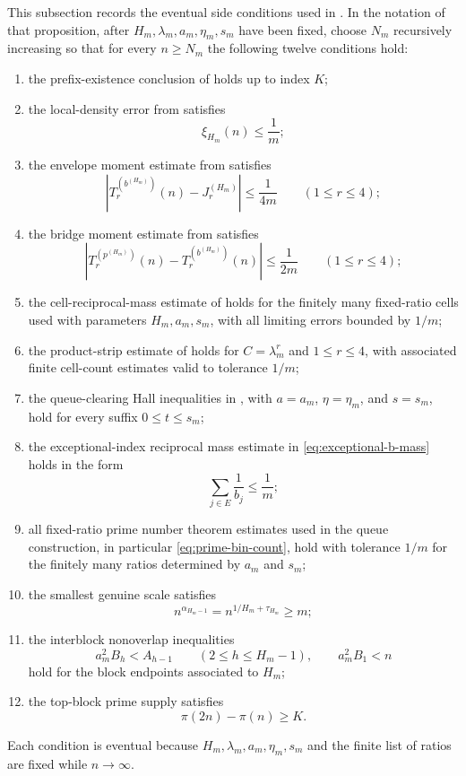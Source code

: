 This subsection records the eventual side conditions used in
.  In the notation of that proposition,
after $H_m,\lambda_m,a_m,\eta_m,s_m$ have been fixed, choose $N_m$ recursively
increasing so that for every $n\ge N_m$ the following twelve conditions hold:
\begin{enumerate}
  \item the prefix-existence conclusion of  holds
  up to index $K$;
  \item the local-density error from  satisfies
  \[
    \xi_{H_m}(n)\le \frac1m;
    \tag{7.10a}\label{eq:diag-xi}
  \]
  \item the envelope moment estimate from 
  satisfies
  \[
    |T_r^{(b^{(H_m)})}(n)-J_r^{(H_m)}|\le \frac{1}{4m}
    \qquad (1\le r\le4);
    \tag{7.10b}\label{eq:diag-envelope}
  \]
  \item the bridge moment estimate from 
  satisfies
  \[
    |T_r^{(p^{(H_m)})}(n)-T_r^{(b^{(H_m)})}(n)|\le \frac{1}{2m}
    \qquad (1\le r\le4);
    \tag{7.10c}\label{eq:diag-bridge}
  \]
  \item the cell-reciprocal-mass estimate of
   holds for the finitely many fixed-ratio
  cells used with parameters $H_m,a_m,s_m$, with all limiting errors bounded
  by $1/m$;
  \item the product-strip estimate of 
  holds for $C=\lambda_m^r$ and $1\le r\le4$, with associated finite
  cell-count estimates valid to tolerance $1/m$;
  \item the queue-clearing Hall inequalities in
  , with $a=a_m$, $\eta=\eta_m$, and
  $s=s_m$, hold for every suffix $0\le t\le s_m$;
  \item the exceptional-index reciprocal mass estimate in
  \eqref{eq:exceptional-b-mass} holds in the form
  \[
    \sum_{j\in E}\frac1{b_j}\le \frac1m;
  \]
  \item all fixed-ratio prime number theorem estimates used in the queue
  construction, in particular \eqref{eq:prime-bin-count}, hold with tolerance
  $1/m$ for the finitely many ratios determined by $a_m$ and $s_m$;
  \item the smallest genuine scale satisfies
  \[
    n^{\alpha_{H_m-1}}
    =
    n^{1/H_m+\tau_{H_m}}
    \ge m;
    \tag{7.10d}\label{eq:diag-scale}
  \]
  \item the interblock nonoverlap inequalities
  \[
    a_m^2B_h<A_{h-1}\qquad(2\le h\le H_m-1),
    \qquad
    a_m^2B_1<n
  \]
  hold for the block endpoints associated to $H_m$;
  \item the top-block prime supply satisfies
  \[
    \pi(2n)-\pi(n)\ge K.
  \]
\end{enumerate}
Each condition is eventual because $H_m,\lambda_m,a_m,\eta_m,s_m$ and the
finite list of ratios are fixed while $n\to\infty$.


